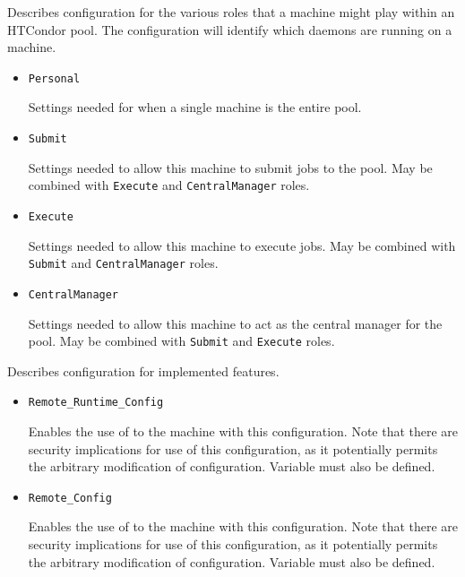\begin{description}

\label{usecategory:ROLE}
\item[\MacroNI{ROLE category}]
  Describes configuration for the various roles that a machine might
  play within an HTCondor pool. The configuration will identify which
  daemons are running on a machine.
  \begin{itemize}
    \item \texttt{Personal}

    Settings needed for when a single machine is the entire pool.

    \item \texttt{Submit}

    Settings needed to allow this machine to submit jobs to the pool.
    May be combined with \texttt{Execute} and \texttt{CentralManager} roles.

    \item \texttt{Execute}

    Settings needed to allow this machine to execute jobs.
    May be combined with \texttt{Submit} and \texttt{CentralManager} roles.

    \item \texttt{CentralManager}

    Settings needed to allow this machine to act as the central manager
    for the pool.
    May be combined with \texttt{Submit} and \texttt{Execute} roles.
  \end{itemize}

\label{usecategory:FEATURE}
\item[\MacroNI{FEATURE category}]
  Describes configuration for implemented features. 
  \begin{itemize}
    \item \texttt{Remote\_Runtime\_Config}

    Enables the use of   to the machine with
    this configuration.
    Note that there are security implications for use of this configuration,
    as it potentially permits the arbitrary modification of configuration.
    Variable  must also be defined.

    \item \texttt{Remote\_Config}

    Enables the use of   to the machine with
    this configuration.
    Note that there are security implications for use of this configuration,
    as it potentially permits the arbitrary modification of configuration.
    Variable  must also be defined.


\end{itemize}
\end{description}
